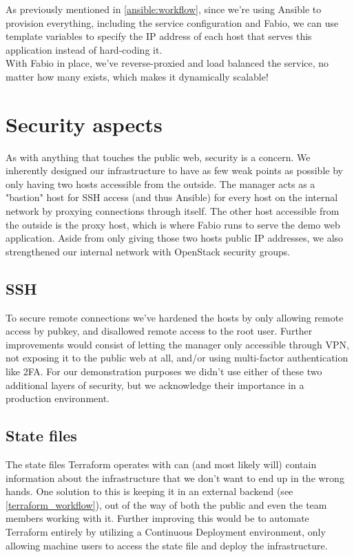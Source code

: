                 As previously mentioned in \ref{ansible:workflow}, since we're using Ansible to provision everything, including the service configuration and Fabio, we can use template variables to specify the IP address of each host that serves this application instead of hard-coding it.\\
                
                With Fabio in place, we've reverse-proxied and load balanced the service, no matter how many exists, which makes it dynamically scalable!
                
    \section{Security aspects}
        As with anything that touches the public web, security is a concern. We inherently designed our infrastructure to have as few weak points as possible by only having two hosts accessible from the outside. The manager acts as a "bastion" host for SSH access (and thus Ansible) for every host on the internal network by proxying connections through itself. The other host accessible from the outside is the proxy host, which is where Fabio runs to serve the demo web application. Aside from only giving those two hosts public IP addresses, we also strengthened our internal network with OpenStack security groups.
        
        \subsection{SSH}
            To secure remote connections we've hardened the hosts by only allowing remote access by pubkey, and disallowed remote access to the root user. Further improvements would consist of letting the manager only accessible through VPN, not exposing it to the public web at all, and/or using multi-factor authentication like 2FA. For our demonstration purposes we didn't use either of these two additional layers of security, but we acknowledge their importance in a production environment.
        
        \subsection{State files} \label{statefiles}
            The state files Terraform operates with can (and most likely will) contain information about the infrastructure that we don't want to end up in the wrong hands. One solution to this is keeping it in an external backend (see \ref{terraform_workflow}), out of the way of both the public and even the team members working with it. Further improving this would be to automate Terraform entirely by utilizing a Continuous Deployment environment, only allowing machine users to access the state file and deploy the infrastructure.
        
